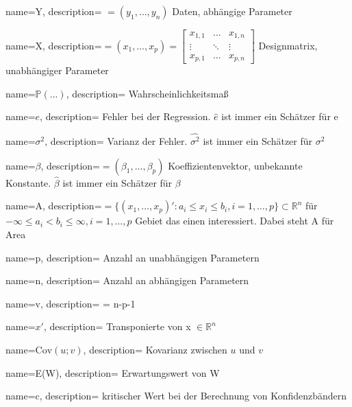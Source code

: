 
{
    name=Y,
    description={ $=(y_1, \ldots, y_n)$ Daten, abhängige Parameter}
}
 
{
    name=X,
    description={$=(x_1, \ldots, x_p)=\begin{bmatrix} x_{1,1} & \ldots & x_{1,n} \\ \vdots & \ddots & \vdots \\ x_{p,1} & \ldots & x_{p,n} \end{bmatrix}$ Designmatrix, unabhängiger Parameter}
}

{
    name=$\mathbb{P}(...)$,
    description={ Wahrscheinlichkeitsmaß }
} 

{
    name=$e$,
    description={ Fehler bei der Regression. $\hat{e}$ ist immer ein Schätzer für e }
} 
 

{
    name=$\sigma^2$,
    description={ Varianz der Fehler. $\widehat{\sigma^2}$ ist immer ein Schätzer für $\sigma^2$ }
} 

{
    name=$\beta$,
    description={$=(\beta_1, \ldots, \beta_p)$ Koeffizientenvektor, unbekannte Konstante. $\hat{\beta}$ ist immer ein Schätzer für $\beta$}
} 

{
    name=A,
    description={$= \{(x_1, \ldots, x_p)' : a_i \leq x_i \leq b_i, i = 1, \ldots, p \} \subset \mathbb{R}^n$ für $- \infty \leq a_i < b_i \leq \infty, i=1, \ldots, p$ Gebiet das einen interessiert. Dabei steht A für Area}
} 
 

{
    name=p,
    description={ Anzahl an unabhängigen Parametern}
} 

{
    name=n,
    description={ Anzahl an abhängigen Parametern}
} 

{
    name=v,
    description={ = n-p-1}
} 

{
    name=$x'$,
    description={ Transponierte von x $\in \mathbb{R}^n$}
} 

{
    name=$\text{Cov}(u;v)$,
    description={ Kovarianz zwischen $u$ und $v$}
} 

{
    name=E(W),
    description={ Erwartungswert von W}
}  
 
{
    name=c,
    description={ kritischer Wert bei der Berechnung von Konfidenzbändern}
} 


